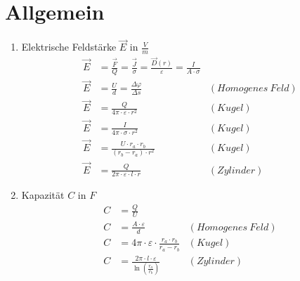 \section{Allgemein}
\begin{enumerate}
    \item Elektrische Feldstärke $ \vec E $ in $ \frac{V}{m} $
    \begin{align*}
        \vec E&= \frac{\vec F}{Q} = \frac{\vec J}{\sigma}= \frac{\vec D(r)}{\varepsilon}=\frac{I}{A\cdot \sigma} \\
        \vec E&= \frac{U}{d}=\frac{\Delta\varphi}{\Delta s} &(Homogenes \ Feld)\\ 
        \vec E&= \frac{Q}{4\pi\cdot\varepsilon\cdot r^2} &(Kugel) \\ 
        \vec E&= \frac{I}{4\pi\cdot\sigma\cdot r^2} &(Kugel) \\ 
        \vec E&= \frac{U\cdot r_a\cdot r_b}{(r_b-r_a)\cdot r^2} &(Kugel) \\ 
        \vec E&= \frac{Q}{2\pi\cdot\varepsilon\cdot l\cdot r} &(Zylinder)
    \end{align*}
    
\item Kapazität $ C $ in $ F $
\begin{align*}
    C&=\frac{Q}{U}\\
    C&=\frac{A\cdot\varepsilon}{d} &(Homogenes \ Feld)\\ 
    C&=4\pi\cdot\varepsilon\cdot \frac{r_a\cdot r_b}{r_a-r_b} &(Kugel)\\ 
    C&=\frac{2\pi\cdot l\cdot\varepsilon}{\ln\left(\frac{r_a}{r_b}\right)} &(Zylinder)
\end{align*}
\end{enumerate}